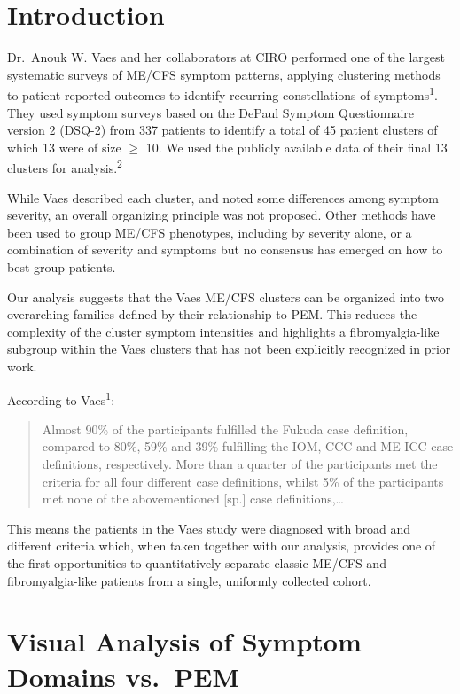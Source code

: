 \documentclass[
  letterpaper,
  DIV=11,
  numbers=noendperiod]{scrartcl}
\begin{document}
\section{Introduction}\label{introduction}

Dr.~Anouk W. Vaes and her collaborators at CIRO performed one of the
largest systematic surveys of ME/CFS symptom patterns, applying
clustering methods to patient-reported outcomes to identify recurring
constellations of symptoms\textsuperscript{1}. They used symptom surveys
based on the DePaul Symptom Questionnaire version 2 (DSQ-2) from 337
patients to identify a total of 45 patient clusters of which 13 were of
size \(\geq\) 10. We used the publicly available data of their final 13
clusters for analysis.\textsuperscript{2}

While Vaes described each cluster, and noted some differences among
symptom severity, an overall organizing principle was not proposed.
Other methods have been used to group ME/CFS phenotypes, including by
severity alone, or a combination of severity and symptoms but no
consensus has emerged on how to best group patients.

Our analysis suggests that the Vaes ME/CFS clusters can be organized
into two overarching families defined by their relationship to PEM. This
reduces the complexity of the cluster symptom intensities and highlights
a fibromyalgia-like subgroup within the Vaes clusters that has not been
explicitly recognized in prior work.

According to Vaes\textsuperscript{1}:

\begin{quote}
Almost 90\% of the participants fulfilled the Fukuda case definition,
compared to 80\%, 59\% and 39\% fulfilling the IOM, CCC and ME-ICC case
definitions, respectively. More than a quarter of the participants met
the criteria for all four different case definitions, whilst 5\% of the
participants met none of the abovementioned {[}sp.{]} case
definitions,\ldots{}
\end{quote}

This means the patients in the Vaes study were diagnosed with broad and
different criteria which, when taken together with our analysis,
provides one of the first opportunities to quantitatively separate
classic ME/CFS and fibromyalgia-like patients from a single, uniformly
collected cohort.

\section{Visual Analysis of Symptom Domains
vs.~PEM}\label{visual-analysis-of-symptom-domains-vs.-pem}
\end{document}
